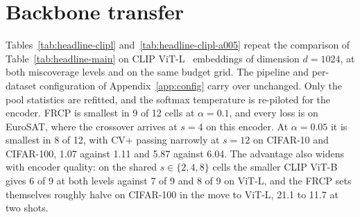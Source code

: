 \section{Backbone transfer}
\label{app:backbones}

Tables~\ref{tab:headline-clipl} and~\ref{tab:headline-clipl-a005}
repeat the comparison of Table~\ref{tab:headline-main} on CLIP
ViT-L~\citep{radford2021clip} embeddings of dimension $d = 1024$, at
both miscoverage levels and on the same budget grid. The pipeline and
per-dataset configuration of Appendix~\ref{app:config} carry over
unchanged. Only the pool statistics are refitted, and the softmax
temperature is re-piloted for the encoder. FRCP is smallest in 9 of 12
cells at $\alpha = 0.1$, and every loss is on EuroSAT, where the
crossover arrives at $s = 4$ on this encoder. At $\alpha = 0.05$ it is
smallest in 8 of 12, with CV+ passing narrowly at $s = 12$ on CIFAR-10
and CIFAR-100, 1.07 against 1.11 and 5.87 against 6.04. The advantage
also widens with encoder quality: on the shared $s \in \{2, 4, 8\}$
cells the smaller CLIP ViT-B gives 6 of 9 at both levels against 7 of
9 and 8 of 9 on ViT-L, and the FRCP sets themselves roughly halve on
CIFAR-100 in the move to ViT-L, 21.1 to 11.7 at two shots.

